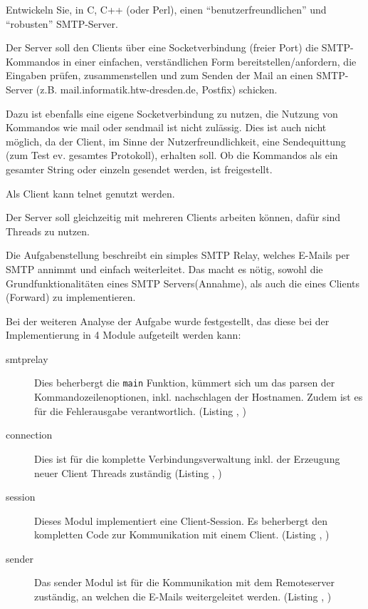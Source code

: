 
Entwickeln Sie, in C, C++ (oder Perl), einen "`benutzerfreundlichen"' und "`robusten"' SMTP-Server.

Der Server soll den Clients \"{u}ber eine Socketverbindung (freier Port) die SMTP-Kommandos in einer einfachen, verst\"{a}ndlichen Form bereitstellen/anfordern, die Eingaben pr\"{u}fen, zusammenstellen und zum Senden der Mail an einen SMTP-Server (z.B. mail.informatik.htw-dresden.de, Postfix) schicken. 

Dazu ist ebenfalls eine eigene Socketverbindung zu nutzen, die Nutzung von Kommandos wie mail oder sendmail ist nicht zul\"{a}ssig. Dies ist auch nicht m\"{o}glich, da der Client, im Sinne der Nutzerfreundlichkeit, eine Sendequittung (zum Test ev. gesamtes Protokoll), erhalten soll. Ob die Kommandos als ein gesamter String oder einzeln gesendet werden, ist freigestellt.

Als Client kann telnet genutzt werden.

Der Server soll gleichzeitig mit mehreren Clients arbeiten k\"{o}nnen, daf\"{u}r sind Threads zu nutzen.

Die Aufgabenstellung beschreibt ein simples SMTP Relay, welches E-Mails per SMTP annimmt und einfach weiterleitet. Das macht es n\"{o}tig, sowohl die Grundfunktionalit\"{a}ten eines SMTP Servers(Annahme), als auch die eines Clients (Forward) zu implementieren.

Bei der weiteren Analyse der Aufgabe wurde festgestellt, das diese bei der Implementierung in 4 Module aufgeteilt werden kann:
\begin{description}
  \item[smtprelay]
    Dies beherbergt die \texttt{main} Funktion, k\"{u}mmert sich um das parsen der Kommandozeilenoptionen, inkl. nachschlagen der Hostnamen. Zudem ist es f\"{u}r die Fehlerausgabe verantwortlich. (Listing , ) 
  \item[connection] 
    Dies ist f\"{u}r die komplette Verbindungsverwaltung inkl. der Erzeugung neuer Client Threads zust\"{a}ndig (Listing , )
  \item[session] 
    Dieses Modul implementiert eine Client-Session. Es beherbergt den kompletten Code zur Kommunikation mit einem Client. (Listing , )
  \item[sender] 
    Das sender Modul ist f\"{u}r die Kommunikation mit dem Remoteserver zust\"{a}ndig, an welchen die E-Mails weitergeleitet werden. (Listing , )
\end{description}

